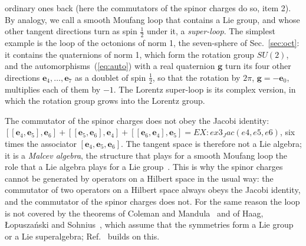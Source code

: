 \documentclass[aps,prd,twocolumn,superscriptaddress,nofootinbib,floatfix,longbibliography]{revtex4-2}
\newcommand{\e}[1]{\mathbf e_{#1}}
\begin{document}
ordinary ones back (here the commutators of the spinor charges do so, item 2). By analogy, we call a smooth Moufang loop that contains a Lie group, and whose other tangent
directions turn as spin $\frac12$ under it, a \emph{super-loop}. The simplest example is the loop of the octonions of norm
1, the seven-sphere of Sec.~\ref{sec:oct}: it contains the quaternions of norm 1, which form the rotation group $SU(2)$,
and the automorphisms~(\ref{eq:auto}) with a real quaternion $\mathbf g$ turn its four other directions $\e4,\dots,\e7$
as a doublet of spin $\frac12$, so that the rotation by $2\pi$, $\mathbf g=-\e0$, multiplies each of them by $-1$. The
Lorentz super-loop is its complex version, in which the rotation group grows into the Lorentz group.

The commutator of the spinor charges does not obey the Jacobi identity: $[[\e4,\e5],\e6]+[[\e5,\e6],\e4]+[[\e6,\e4],\e5]
={{EX:ex3_Jac(e4,e5,e6)}}$, six times the associator $[\e4,\e5,\e6]$. The tangent space is therefore not a Lie algebra;
it is a \emph{Malcev algebra}, the structure that plays for a smooth Moufang loop the role that a Lie algebra plays for
a Lie group~\cite{Malcev1955}. This is why the spinor charges cannot be generated by operators on a Hilbert space in the
usual way: the commutator of two operators on a Hilbert space always obeys the Jacobi identity, and the commutator of the
spinor charges does not. For the same reason the loop is not covered by the theorems of Coleman and
Mandula~\cite{ColemanMandula1967} and of Haag, \L{}opusza\'nski and Sohnius~\cite{HLS1975}, which assume that the
symmetries form a Lie group or a Lie superalgebra; Ref.~\cite{Nash2026} builds on this.
\end{document}
